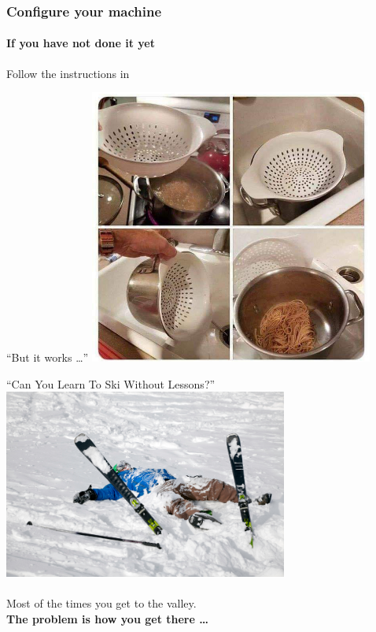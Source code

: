 \documentclass{beamer}%
\begin{document}


\begin{frame}
	\frametitle{Configure your machine}
	\framesubtitle{If you have not done it yet}
	\centering
	Follow the instructions in\\
	\myurl{\homepagesetup}
\end{frame}

\begin{frame}{``But it works \ldots''}
	\centering 
	\includegraphics[width=0.7\textwidth]{figures/itDoesTheJob.jpg}
\end{frame}

\begin{frame}{``Can You Learn To Ski Without Lessons?''}
	\centering 
	\includegraphics[width=0.7\textwidth]{figures/f737c96e-beginner-skier.jpg}
	\\
	{\scriptsize{}}
	\\
	\vspace{0.2cm}
	Most of the times you get to the valley. 
	\\
	\textbf{The problem is how you get there \ldots}
\end{frame}

\end{document}
